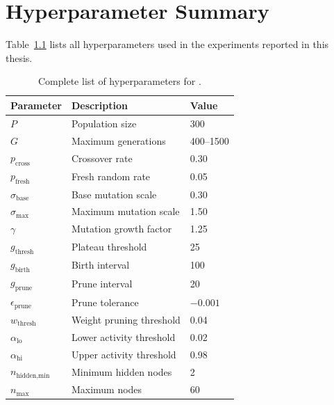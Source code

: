 \chapter{Hyperparameter Summary}
\label{app:hyperparameters}

Table~\ref{tab:app-all-hyperparameters} lists all hyperparameters
used in the experiments reported in this thesis.

\begin{table}[h]
  \centering
  \small
  \caption{Complete list of hyperparameters for \modnet{}.}
  \label{tab:app-all-hyperparameters}
  \begin{tabular}{lll}
    \toprule
    \textbf{Parameter} & \textbf{Description} & \textbf{Value} \\
    \midrule
    $P$                & Population size              & 300 \\
    $G$                & Maximum generations          & 400--1500 \\
    $p_{\text{cross}}$ & Crossover rate               & 0.30 \\
    $p_{\text{fresh}}$ & Fresh random rate            & 0.05 \\
    $\sigma_{\text{base}}$ & Base mutation scale      & 0.30 \\
    $\sigma_{\max}$    & Maximum mutation scale       & 1.50 \\
    $\gamma$           & Mutation growth factor       & 1.25 \\
    $g_{\text{thresh}}$& Plateau threshold            & 25 \\
    $g_{\text{birth}}$ & Birth interval               & 100 \\
    $g_{\text{prune}}$ & Prune interval               & 20 \\
    $\epsilon_{\text{prune}}$ & Prune tolerance       & $-0.001$ \\
    $w_{\text{thresh}}$& Weight pruning threshold     & 0.04 \\
    $\alpha_{\text{lo}}$& Lower activity threshold    & 0.02 \\
    $\alpha_{\text{hi}}$& Upper activity threshold    & 0.98 \\
    $n_{\text{hidden,min}}$& Minimum hidden nodes    & 2 \\
    $n_{\max}$         & Maximum nodes                & 60 \\
    \bottomrule
  \end{tabular}
\end{table}

